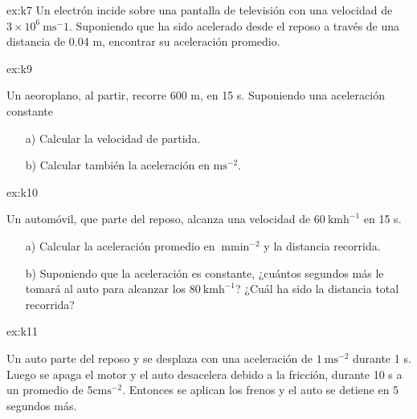 \begin{multicols}{2}
     \begin{excercise}{ex:k7}{
            Un electrón incide sobre una pantalla de televisión con una velocidad de $3 \times 10^{6}\ \mathrm{ m s^-1}$. Suponiendo que ha sido acelerado desde el reposo a través de una distancia de 0.04 m, encontrar su aceleración promedio. 
         }
    \end{excercise}
    \begin{excercise}[][][a) $v_0=80\ \mathrm{ms^{-1}}$ b)  $a=5.33\ \mathrm{ms^{-2}}$,  $x=77\ \mathrm{m}$;]{ex:k9}{
            Un aeoroplano, al partir, recorre 600 m, en 15 s. Suponiendo una aceleración constante              
            \begin{itemize}
                \item[a)] Calcular la velocidad de partida.               
                \item[b)] Calcular también la aceleración en  $\mathrm{ m s^{-2}}$.
            \end{itemize}
         }
    \end{excercise}
    \begin{excercise}[][][a) $a=4000\ \mathrm{m min^{-2}}$,  $x=125\ \mathrm{m}$; b)  $t=5\ \mathrm{s}$,  $x=223\ \mathrm{m}$;]{ex:k10}{
            Un automóvil, que parte del reposo, alcanza una velocidad de $60  \ \mathrm{ km h^{-1}}$ en 15 s. 
            \begin{itemize}
                \item[a)] Calcular la aceleración promedio en $\ \mathrm{ m min^{-2}}$ y la distancia recorrida.               
                \item[b)] Suponiendo que la aceleración es constante, ¿cuántos segundos más le tomará al auto para alcanzar los $80  \ \mathrm{ km h^{-1}}$? ¿Cuál ha sido la distancia total recorrida?             
            \end{itemize} 
         }
    \end{excercise}
    \begin{excercise}[][][a) $x=9.25\ \mathrm{m}$]{ex:k11}{
            Un auto parte del reposo y se desplaza con una aceleración de $1\  \mathrm{ms^{-2}}$ durante 1 s. Luego se apaga el motor y el auto desacelera debido a la fricción, durante 10 s a un promedio de $5 \mathrm{cms^{-2}}$. Entonces se aplican los frenos y el auto se detiene en 5 segundos más.             \begin{itemize}

\end{itemize}}
\end{excercise}
\end{multicols}

